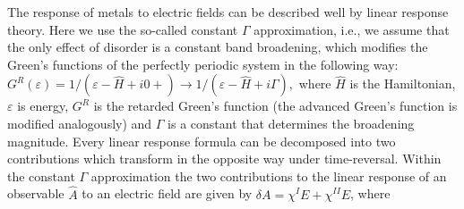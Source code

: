\documentclass[aps,prl,reprint,amsmath,amssymb,superscriptaddress]{revtex4-1}
\begin{document}
The response of metals to electric fields can be described well by linear response theory. Here we use the so-called constant $\Gamma$ approximation, i.e., we assume that the only effect of disorder is a constant band broadening, which modifies the Green's functions of the perfectly periodic system in the following way:
$ G^{R}(\varepsilon) = 1/(\varepsilon-\hat{H} + i 0+)  \rightarrow 1/(\varepsilon-\hat{H} + i\Gamma),$
where $\hat{H}$ is the Hamiltonian, $\varepsilon$ is energy, $G^R$ is the retarded Green's function (the advanced Green's function is modified analogously) and $\Gamma$ is a constant that determines the broadening magnitude. Every linear response formula can be decomposed into two contributions which transform in the opposite way under time-reversal. Within the constant $\Gamma$ approximation the two contributions to the linear response of an observable $\hat{A}$ to an electric field are given by $\delta{A} = \chi^I E+\chi^{II}E$, where \cite{freimuth2014}
\end{document}
